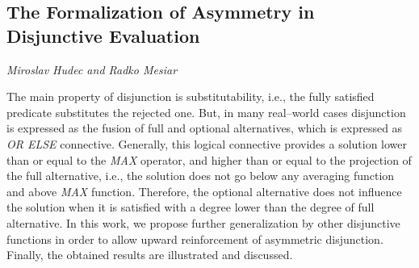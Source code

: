\documentclass[../booklet.tex]{subfiles}
\begin{document}
\subsection[The Formalization of Asymmetry in Disjunctive Evaluation. {\it Miroslav Hudec and Radko Mesiar}]{The Formalization of Asymmetry in Disjunctive Evaluation}
 

\begin{center}
  {\it Miroslav Hudec and Radko Mesiar}
\end{center}

\vskip 0.8cm


The main property of disjunction is substitutability, i.e., the fully satisfied predicate substitutes the rejected one. But, in many real--world cases disjunction is expressed as the fusion of full and optional alternatives, which is expressed as \textit{OR ELSE} connective. 
Generally, this logical connective provides a solution lower than or equal to the \textit{MAX} operator, and higher than or equal to the projection of the full alternative, i.e., the solution does not go below any averaging function and above \textit{MAX} function. Therefore, the optional alternative does not influence the solution when it is satisfied with a degree lower than the degree of full alternative. In this work, we propose further generalization by other disjunctive functions in order to allow upward reinforcement of asymmetric disjunction. Finally, the obtained results are illustrated and discussed.

\end{document}
